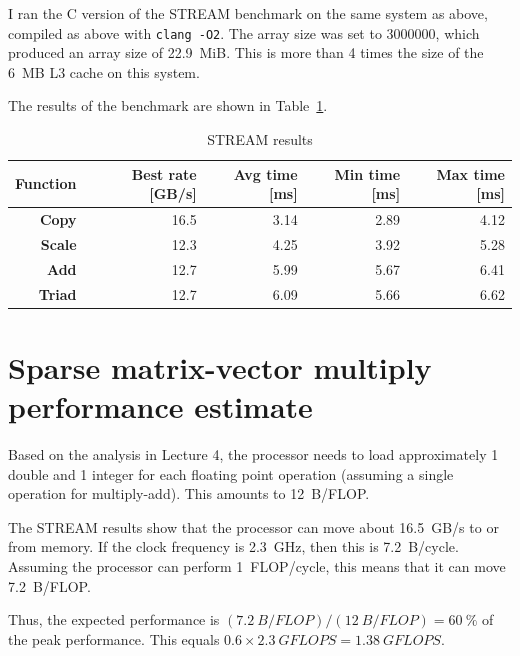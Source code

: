 \documentclass{article}
\begin{document}
I ran the C version of the STREAM benchmark on the same system as above, compiled as above with \texttt{clang -O2}. The array size was set to \num{3000000}, which produced an array size of \SI{22.9}{MiB}. This is more than 4 times the size of the \SI{6}{MB} L3 cache on this system.

The results of the benchmark are shown in Table~\ref{tab:stream}.

\begin{table}[]
\centering
\begin{tabular}{@{}rrrrr@{}}
\toprule
\textbf{Function} & Best rate {[}GB/s{]} & Avg time {[}ms{]} & Min time {[}ms{]} & Max time {[}ms{]} \\ \midrule
\textbf{Copy}     & 16.5                 & 3.14              & 2.89              & 4.12              \\
\textbf{Scale}    & 12.3                 & 4.25              & 3.92              & 5.28              \\
\textbf{Add}      & 12.7                 & 5.99              & 5.67              & 6.41              \\
\textbf{Triad}    & 12.7                 & 6.09              & 5.66              & 6.62              \\ \bottomrule
\end{tabular}
\caption{STREAM results}
\label{tab:stream}
\end{table}

\section{Sparse matrix-vector multiply performance estimate}

Based on the analysis in Lecture 4, the processor needs to load approximately 1 double and 1 integer for each floating point operation (assuming a single operation for multiply-add). This amounts to \SI{12}{B/FLOP}.

The STREAM results show that the processor can move about \SI{16.5}{GB/s} to or from memory. If the clock frequency is \SI{2.3}{GHz}, then this is \SI{7.2}{B/cycle}. Assuming the processor can perform \SI{1}{FLOP/cycle}, this means that it can move \SI{7.2}{B/FLOP}.

Thus, the expected performance is $(\SI{7.2}{B/FLOP}) / (\SI{12}{B/FLOP}) = \SI{60}{\percent}$ of the peak performance. This equals $0.6 \times \SI{2.3}{GFLOPS} = \SI{1.38}{GFLOPS}$.
\end{document}
